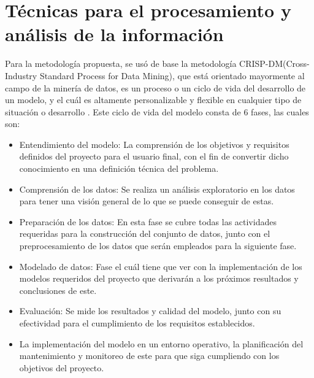 \section{Técnicas para el procesamiento y análisis de la información}
Para la metodología propuesta, se usó de base la metodología CRISP-DM(Cross-Industry Standard Process for Data Mining), que está orientado mayormente al campo de la minería de datos, es un proceso o un ciclo de vida del desarrollo de un modelo, y el cuál es altamente personalizable y flexible en cualquier tipo de situación o desarrollo \parencite{gl_crisp}. Este ciclo de vida del modelo consta de 6 fases, las cuales son:

\begin{itemize}
	\item Entendimiento del modelo: La comprensión de los objetivos y requisitos definidos del proyecto para el usuario final, con el fin de convertir dicho conocimiento en una definición técnica del problema.
	\item Comprensión de los datos: Se realiza un análisis exploratorio en los datos para tener una visión general de lo que se puede conseguir de estas.
	\item Preparación de los datos: En esta fase se cubre todas las actividades requeridas para la construcción del conjunto de datos, junto con el preprocesamiento de los datos que serán empleados para la siguiente fase.
	\item Modelado de datos: Fase el cuál tiene que ver con la implementación de los modelos requeridos del proyecto que derivarán a los próximos resultados y conclusiones de este.
	\item Evaluación: Se mide los resultados y calidad del modelo, junto con su efectividad para el cumplimiento de los requisitos establecidos.
	\item La implementación del modelo en un entorno operativo, la planificación del mantenimiento y monitoreo de este para que siga cumpliendo con los objetivos del proyecto.
\end{itemize}
